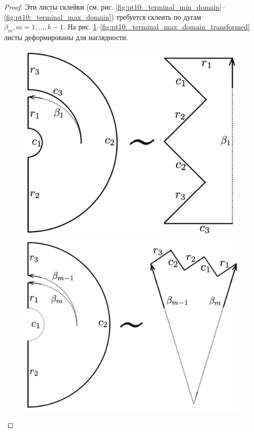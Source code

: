 \begin{proof}
Эти листы склейки (см. рис.  \ref{fig:pt10:_terminal_min_domain}--\ref{fig:pt10:_terminal_max_domain}) требуется склеить по дугам $\beta_m, m=1, \ldots, k-1$.
На рис. \ref{fig:pt10:_terminal_min_domain_transformed}--\ref{fig:pt10:_terminal_max_domain_transformed} листы деформированы для наглядности.
\begin{figure}[!htb]
\centering
\includegraphics[scale=0.1]{images/section3_circular/atoms/branching/terminal_min_transformed.pdf}
\caption{}
    \label{fig:pt10:_terminal_min_domain_transformed}
\endminipage\hfill
{}
\centering
\includegraphics[scale=0.1]{images/section3_circular/atoms/branching/branching_domain_transformed.pdf}

\end{figure}
\end{proof}
